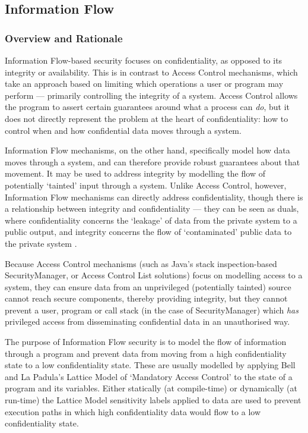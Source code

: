 \subsection{Information Flow}

\subsubsection{Overview and Rationale}

Information Flow-based security focuses on confidentiality, as opposed to its integrity or availability. This is in contrast to Access Control mechanisms, which take an approach based on limiting which operations a user or program may perform --- primarily controlling the integrity of a system. Access Control allows the program to assert certain guarantees around what a process can \textit{do}, but it does not directly represent the problem at the heart of confidentiality: how to control when and how confidential data moves through a system.

Information Flow mechanisms, on the other hand, specifically model how data moves through a system, and can therefore provide robust guarantees about that movement. It may be used to address integrity by modelling the flow of potentially `tainted' input through a system. Unlike Access Control, however, Information Flow mechanisms can directly address confidentiality, though there is a relationship between integrity and confidentiality --- they can be seen as duals, where confidentiality concerns the `leakage' of data from the private system to a public output, and integrity concerns the flow of `contaminated' public data to the private system \cite{biba1977integrity} \cite{clarkson2010confintegrity}.

Because Access Control mechanisms (such as Java's stack inspection-based SecurityManager, or Access Control List solutions) focus on modelling access to a system, they can ensure data from an unprivileged (potentially tainted) source cannot reach secure components, thereby providing integrity, but they cannot prevent a user, program or call stack (in the case of SecurityManager) which \textit{has} privileged access from disseminating confidential data in an unauthorised way.

The purpose of Information Flow security is to model the flow of information through a program and prevent data from moving from a high confidentiality state to a low confidentiality state. These are usually modelled by applying Bell and La Padula's Lattice Model \cite{bell1976lattice} of `Mandatory Access Control' to the state of a program and its variables. Either statically (at compile-time) or dynamically (at run-time) the Lattice Model sensitivity labels applied to data are used to prevent execution paths in which high confidentiality data would flow to a low confidentiality state.

